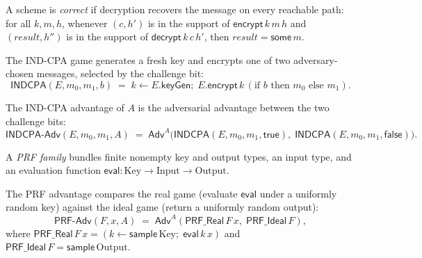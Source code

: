 \begin{definition}[Correctness]
  \label{def:enc-correct}
  \leanok
  A scheme is \emph{correct} if decryption recovers the message on every reachable
  path: for all $k, m, h$, whenever $(c, h')$ is in the support of
  $\mathsf{encrypt}\,k\,m\,h$ and $(\mathit{result}, h'')$ is in the support of
  $\mathsf{decrypt}\,k\,c\,h'$, then $\mathit{result} = \mathsf{some}\,m$.
\end{definition}

\begin{definition}
  \label{def:indcpa-game}
  \leanok
  The IND-CPA game generates a fresh key and encrypts one of two adversary-chosen
  messages, selected by the challenge bit:
  \[
    \mathsf{INDCPA}(E, m_0, m_1, b) \;=\;
      k \gets E.\mathsf{keyGen};\; E.\mathsf{encrypt}\,k\,(\text{if } b \text{ then } m_0 \text{ else } m_1).
  \]
\end{definition}

\begin{definition}
  \label{def:indcpa-adv}
  \leanok
  The IND-CPA advantage of $A$ is the adversarial advantage between the two
  challenge bits:
  \[
    \mathsf{INDCPA\text{-}Adv}(E, m_0, m_1, A)
      \;=\; \mathsf{Adv}^A\!\bigl(\mathsf{INDCPA}(E, m_0, m_1, \mathsf{true}),\;
        \mathsf{INDCPA}(E, m_0, m_1, \mathsf{false})\bigr).
  \]
\end{definition}

\begin{definition}
  \label{def:prfscheme}
  \leanok
  A \emph{PRF family} bundles finite nonempty key and output types, an input type,
  and an evaluation function $\mathsf{eval} : \mathrm{Key} \to \mathrm{Input} \to \mathrm{Output}$.
\end{definition}

\begin{definition}
  \label{def:prf-adv}
  \leanok
  The PRF advantage compares the real game (evaluate $\mathsf{eval}$ under a uniformly
  random key) against the ideal game (return a uniformly random output):
  \[
    \mathsf{PRF\text{-}Adv}(F, x, A)
      \;=\; \mathsf{Adv}^A(\mathsf{PRF\_Real}\,F\,x,\; \mathsf{PRF\_Ideal}\,F),
  \]
  where $\mathsf{PRF\_Real}\,F\,x = (k \gets \mathsf{sample}\,\mathrm{Key};\; \mathsf{eval}\,k\,x)$
  and $\mathsf{PRF\_Ideal}\,F = \mathsf{sample}\,\mathrm{Output}$.
\end{definition}

